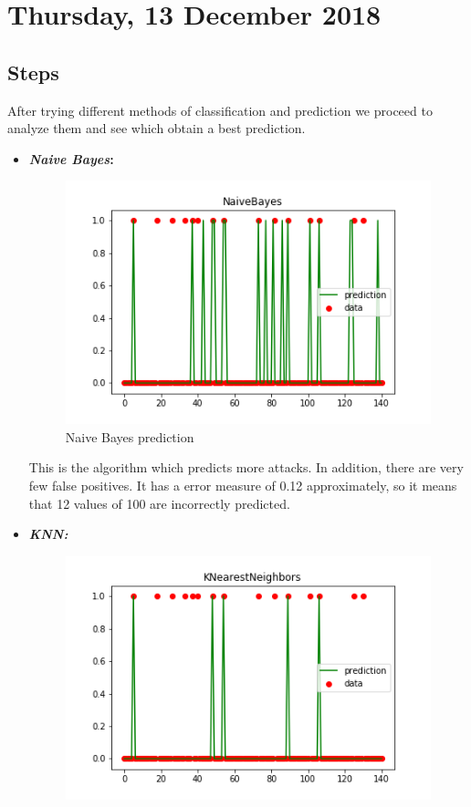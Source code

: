 \section{Thursday, 13 December 2018}

\subsection{Steps}
After trying different methods of classification and prediction we proceed to analyze them and see which obtain a best prediction.
\begin{itemize}
	\item \textbf{\textit{Naive Bayes}: } 
	\begin{figure}[H]
		\centering
		\includegraphics{../../reports/figures/NaiveBayesPrediction}
		\caption{Naive Bayes prediction}
	\end{figure}
	This is the algorithm which predicts more attacks. In addition, there are very few false positives. It has a error measure of 0.12 approximately, so it means that 12 values of 100 are incorrectly predicted.
	\item \textbf{\textit{KNN:}}
		\begin{figure}[H]
		\centering
		\includegraphics{../../reports/figures/KNearestNeighborsPrediction}

\end{figure}
\end{itemize}
